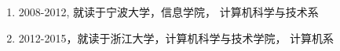 \begin{resume}
\begin{enumerate}
\item{2008-2012, 就读于宁波大学，信息学院， 计算机科学与技术系}
\item{2012-2015，就读于浙江大学，计算机科学与技术学院， 计算机系}
\end{enumerate}
\end{resume}
